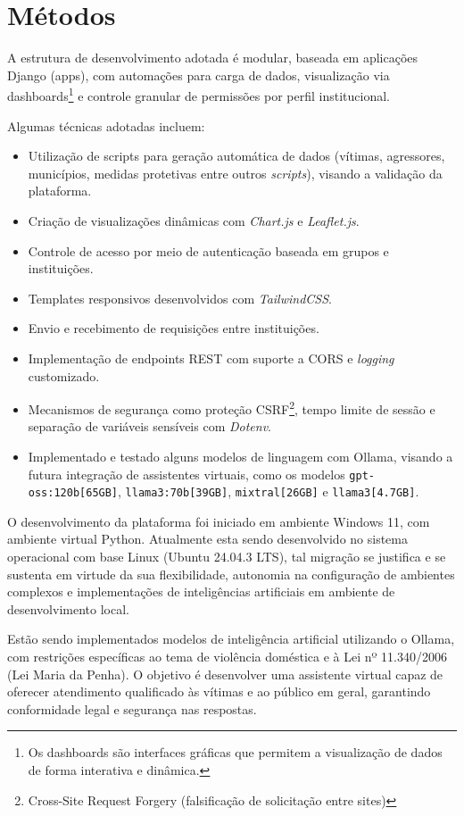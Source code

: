 \section{Métodos}

A estrutura de desenvolvimento adotada é modular, baseada em aplicações Django (apps), com automações para carga de dados, visualização via dashboards\footnote{Os dashboards são interfaces gráficas que permitem a visualização de dados de forma interativa e dinâmica.} e controle granular de permissões por perfil institucional.

Algumas técnicas adotadas incluem:
\begin{itemize}
\item Utilização de scripts para geração automática de dados (vítimas, agressores, municípios, medidas protetivas entre outros \textit{scripts}), visando a validação da plataforma.
\item Criação de visualizações dinâmicas com \textit{Chart.js} e \textit{Leaflet.js}.
\item Controle de acesso por meio de autenticação baseada em grupos e instituições.
\item Templates responsivos desenvolvidos com \textit{TailwindCSS}.
\item Envio e recebimento de requisições entre instituições.
\item Implementação de endpoints REST com suporte a CORS e \textit{logging} customizado.
\item Mecanismos de segurança como proteção CSRF\footnote{Cross-Site Request Forgery (falsificação de solicitação entre sites)}, tempo limite de sessão e separação de variáveis sensíveis com \textit{Dotenv}.
\item Implementado e testado alguns modelos de linguagem com Ollama, visando a futura integração de assistentes virtuais, como os modelos \texttt{gpt-oss:120b[65GB]}, \texttt{llama3:70b[39GB]}, \texttt{mixtral[26GB]} e \texttt{llama3[4.7GB]}.
\end{itemize}

\par O desenvolvimento da plataforma foi iniciado em ambiente Windows 11, com ambiente virtual Python. Atualmente esta sendo desenvolvido no sistema operacional com base Linux (Ubuntu 24.04.3 LTS), tal migração se justifica e se sustenta em virtude da sua flexibilidade, autonomia na configuração de ambientes complexos e implementações de inteligências artificiais em ambiente de desenvolvimento local.

\par Estão sendo implementados modelos de inteligência artificial utilizando o Ollama, com restrições específicas ao tema de violência doméstica e à Lei nº 11.340/2006 (Lei Maria da Penha). O objetivo é desenvolver uma assistente virtual capaz de oferecer atendimento qualificado às vítimas e ao público em geral, garantindo conformidade legal e segurança nas respostas.

